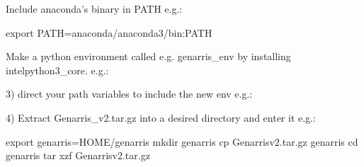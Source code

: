 \documentclass[letterpaper,10pt,english]{sphinxmanual}
\begin{document}
Include anaconda's binary in PATH
e.g.:

\begin{sphinxVerbatim}[commandchars=\\\{\}]
export PATH=\PYGZdl{}anaconda/anaconda3/bin:\PYGZdl{}PATH
\end{sphinxVerbatim}

Make a python environment called e.g. genarris\_env by installing intelpython3\_core.
e.g.:

\begin{sphinxVerbatim}[commandchars=\\\{\}]
    
     
\end{sphinxVerbatim}

3) direct your path variables to include the new env
e.g.:

\begin{sphinxVerbatim}[commandchars=\\\{\}]
 

 
\end{sphinxVerbatim}

4) Extract Genarris\_v2.tar.gz into a desired directory and enter it
e.g.:

\begin{sphinxVerbatim}[commandchars=\\\{\}]
export \PYGZdl{}genarris=\PYGZdl{}\PYGZob{}HOME\PYGZcb{}/genarris
mkdir \PYGZdl{}genarris
cp Genarris\PYGZus{}v2.tar.gz \PYGZdl{}genarris
cd \PYGZdl{}genarris
tar \PYGZhy{}xzf Genarris\PYGZus{}v2.tar.gz
\end{sphinxVerbatim}
\end{document}
